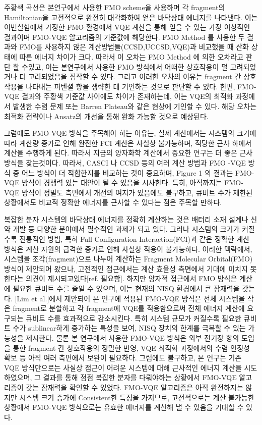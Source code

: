 \documentclass[pdflatex,sn-mathphys-num]{sn-jnl}%
\theoremstyle{thmstyleone}%
\theoremstyle{thmstyletwo}%
\theoremstyle{thmstylethree}%
\begin{document}
주황색 곡선은 본연구에서 사용한 FMO scheme을 사용하며 각 fragment의 Hamiltonian을 고전적으로 완전히 대각화하여 얻은 바닥상태 에너지를 나타낸다. 이는 이번실험에서 가정한 FMO 환경에서 VQE 계산을 통해 얻을 수 있는 가장 이상적인 결과이며 FMO-VQE 알고리즘의 기준값에 해당한다. FMO Method 를 사용한 두 결과와 FMO를 사용하지 않은 계산방법들(CCSD,UCCSD,VQE)과 비교했을 때 산화 상태에 따른 에너지 차이가 크다. 따라서 이 오차는 FMO Method 에 의한 오차라고 판단 할 수있고, 이는 본연구에서 사용한 FMO 방식에서 어떠한 상호작용이 덜 고려되었거나 더 고려되었음을 짐작할 수 있다. 그리고 이러한 오차의 이유는 fragment 간 상호작용을 나타내는 퍼텐셜 항을 생략한 데 기인하는 것으로 판단할 수 있다. 한편, FMO-VQE 결과와 주황색 기준값 사이에도 차이가 존재하는데, 이는 VQE의 최적화 과정에서 발생한 수렴 문제 또는 Barren Plateau와 같은 현상에 기인할 수 있다. 해당 오차는 최적화 전략이나 Ansatz의 개선을 통해 완화 가능할 것으로 예상된다.

그럼에도 FMO-VQE 방식을 주목해야 하는 이유는, 실제 계산에서는 시스템의 크기에 따라 계산량 증가로 인해 완전한 FCI 계산은 사실상 불가능하며, 적당한 근사 하에서 계산을 수행하게 된다. 
따라서 지금의 양자화학 계산에서 중요한 연구는 더 좋은 근사방식을 찾는것이다. 따라서, CASCI 나 CCSD 등의 여러 계산 방법과 FMO -VQE 방식 중 어느 방식이 더 적합한지를 비교하는 것이 중요하며, Figure 1 의 결과는 FMO-VQE 방식이 경쟁력 있는 대안이 될 수 있음을 시사한다. 특히, 아직까지는 FMO-VQE 방식이 정밀도 측면에서 개선의 여지가 있음에도 불구하고, 큐비트 수가 제한된 상황에서도 비교적 정확한 에너지를 근사할 수 있다는 점은 주목할 만하다.

복잡한 분자 시스템의 바닥상태 에너지를 정확히 계산하는 것은 배터리 소재 설계나 신약 개발 등 다양한 분야에서 필수적인 과제가 되고 있다. 
그러나 시스템의 크기가 커질수록 전통적인 방법, 특히 Full Configuration Interaction(FCI)과 같은 정확한 계산 방식은 계산 자원의 급격한 증가로 인해 사실상 적용이 불가능하다.
이러한 맥락에서, 시스템을 조각(fragment)으로 나누어 계산하는 Fragment Molecular Orbital(FMO) 방식이 제안되어 왔으나, 고전적인 접근에서는 계산 효율성 측면에서 기대에 미치지 못한다는 의견이 제시되고있다[ref. 필요함]. 
하지만 양자적 접근에서 FMO 방식은 계산에 필요한 큐비트 수를 줄일 수 있으며, 이는 현재의 NISQ 환경에서 큰 잠재력을 갖는다. [Lim et al.]에서 제안되어 본 연구에 적용된 FMO-VQE 방식은 전체 시스템을 작은 fragment로 분할하고 각 fragment에 VQE를 적용함으로써 전체 에너지 계산에 요구되는 큐비트 수를 효과적으로 감소시킨다. 특히 시스템 규모가 커질수록 필요한 큐비트 수가 sublinear하게 증가하는 특성을 보여, NISQ 장치의 한계를 극복할 수 있는 가능성을 제시한다.
물론 본 연구에서 사용한 FMO-VQE 방식은 외부 전기장 항의 도입을 통한 fragment 간 상호작용의 정밀한 반영, VQE 최적화 과정에서의 수렴 안정성 확보 등 아직 여러 측면에서 보완이 필요하다. 그럼에도 불구하고, 본 연구는 기존 VQE 방식만으로는 사실상 접근이 어려운 시스템에 대해 근사적인 에너지 계산을 시도하였으며, 그 결과를 통해 점점 복잡한 분자를 다뤄야하는 상황에서 FMO-VQE 알고리즘이 갖는 잠재력을 확인할 수 있었다. FMO-VQE 알고리즘은 아직 완전하지는 않지만 시스템 크기 증가에 Consistent한 특징을 가지므로, 고전적으로는 계산 불가능한 상황에서 FMO-VQE 방식으로는 유효한 에너지를 계산해 낼 수 있음을 기대할 수 있다. 
\end{document}
